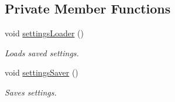 \subsection*{Private Member Functions}
\begin{DoxyCompactItemize}
\item 
\mbox{\label{classSGMainWindow_a576d4a2d0b9e9b077faa59d6a1db1485}} 
void \hyperlink{classSGMainWindow_a576d4a2d0b9e9b077faa59d6a1db1485}{settings\+Loader} ()
\begin{DoxyCompactList}\small\item\em Loads saved settings. \end{DoxyCompactList}\item 
\mbox{\label{classSGMainWindow_ab14d201c21675bd6c5fddd79a4bd15e9}} 
void \hyperlink{classSGMainWindow_ab14d201c21675bd6c5fddd79a4bd15e9}{settings\+Saver} ()
\begin{DoxyCompactList}\small\item\em Saves settings. \end{DoxyCompactList}\end{DoxyCompactItemize}
